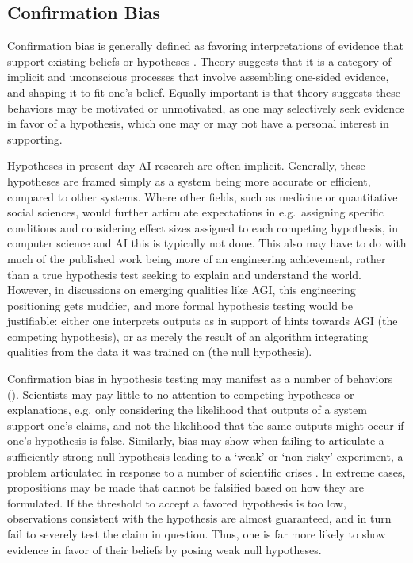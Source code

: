 \subsection{Confirmation Bias}

Confirmation bias is generally defined as favoring interpretations of evidence that support existing beliefs or hypotheses \citep{nickerson1998confirmation}. Theory suggests that it is a category of implicit and unconscious processes that involve assembling one-sided evidence, and shaping it to fit one's belief. Equally important is that theory suggests these behaviors may be motivated or unmotivated, as one may selectively seek evidence in favor of a hypothesis, which one may or may not have a personal interest in supporting.

Hypotheses in present-day AI research are often implicit. Generally, these hypotheses are framed simply as a system being more accurate or efficient, compared to other systems. Where other fields, such as medicine or quantitative social sciences, would further articulate expectations in e.g.\ assigning specific conditions and considering effect sizes assigned to each competing hypothesis, in computer science and AI this is typically not done. This also may have to do with much of the published work being more of an engineering achievement, rather than a true hypothesis test seeking to explain and understand the world. 
However, in discussions on emerging qualities like AGI, this engineering positioning gets muddier, and more formal hypothesis testing would be justifiable: either one interprets outputs as in support of hints towards AGI (the competing hypothesis), or as merely the result of an algorithm integrating qualities from the data it was trained on (the null hypothesis). 


Confirmation bias in hypothesis testing may manifest as a number of behaviors (\citet{nickerson1998confirmation}). Scientists may pay little to no attention to competing hypotheses or explanations, e.g. only considering the likelihood that outputs of a system support one's claims, and not the likelihood that the same outputs might occur if one's hypothesis is false. Similarly, bias may show when failing to articulate a sufficiently strong null hypothesis leading to a `weak' or `non-risky' experiment, a problem articulated in response to a number of scientific crises \citep{claesen2022severity}. In extreme cases, propositions may be made that cannot be falsified based on how they are formulated. If the threshold to accept a favored hypothesis is too low, observations consistent with the hypothesis are almost guaranteed, and in turn fail to severely test the claim in question. Thus, one is far more likely to show evidence in favor of their beliefs by posing weak null hypotheses. 

